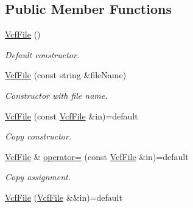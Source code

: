 \subsection*{Public Member Functions}
\begin{DoxyCompactItemize}
\item 
\mbox{\label{classvarfiles_1_1_vcf_file_ab3135edea1e9a68346704e8efeece4d0}} 
\hyperlink{classvarfiles_1_1_vcf_file_ab3135edea1e9a68346704e8efeece4d0}{Vcf\+File} ()
\begin{DoxyCompactList}\small\item\em Default constructor. \end{DoxyCompactList}\item 
\hyperlink{classvarfiles_1_1_vcf_file_a1e9b1de448031f679805360f6bc1042f}{Vcf\+File} (const string \&file\+Name)
\begin{DoxyCompactList}\small\item\em Constructor with file name. \end{DoxyCompactList}\item 
\mbox{\label{classvarfiles_1_1_vcf_file_ac25324141a60b3934f35966bd75de409}} 
\hyperlink{classvarfiles_1_1_vcf_file_ac25324141a60b3934f35966bd75de409}{Vcf\+File} (const \hyperlink{classvarfiles_1_1_vcf_file}{Vcf\+File} \&in)=default
\begin{DoxyCompactList}\small\item\em Copy constructor. \end{DoxyCompactList}\item 
\mbox{\label{classvarfiles_1_1_vcf_file_a738a69a53915d5d7a55424e57e35ef0f}} 
\hyperlink{classvarfiles_1_1_vcf_file}{Vcf\+File} \& \hyperlink{classvarfiles_1_1_vcf_file_a738a69a53915d5d7a55424e57e35ef0f}{operator=} (const \hyperlink{classvarfiles_1_1_vcf_file}{Vcf\+File} \&in)=default
\begin{DoxyCompactList}\small\item\em Copy assignment. \end{DoxyCompactList}\item 
\mbox{\label{classvarfiles_1_1_vcf_file_ac8eeba4da3a7213a1469ea170702476a}} 
\hyperlink{classvarfiles_1_1_vcf_file_ac8eeba4da3a7213a1469ea170702476a}{Vcf\+File} (\hyperlink{classvarfiles_1_1_vcf_file}{Vcf\+File} \&\&in)=default

\end{DoxyCompactItemize}
